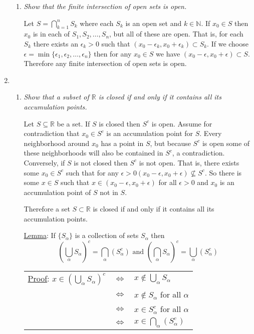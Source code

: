 \documentclass[11pt]{article}
\begin{document}
\begin{enumerate}
\begin{enumerate}
\item \emph{Show that the finite intersection of open sets is open.}

Let $S = \bigcap_{k=1}^nS_k$ where each $S_k$ is an open set and $k \in \mathbb{N}$.  If $x_0 \in S$ then $x_0$ is in each of $S_1,S_2,\ldots,S_n$, but all of these are open.  That is, for each $S_k$ there exists an $\epsilon_k > 0$ such that $(x_0 - \epsilon_k, x_0 + \epsilon_k) \subset S_k$.  If we choose $\epsilon = \min\{\epsilon_1,\epsilon_2,\ldots,\epsilon_n\}$ then for any $x_0 \in S$ we have $(x_0 - \epsilon, x_0 + \epsilon) \subset S$.  Therefore any finite intersection of open sets is open.
\end{enumerate}

\item 
\begin{enumerate}
\item \emph{Show that a subset of $\mathbb{R}$ is closed if and only if it contains all its accumulation points.}

Let $S \subseteq \mathbb{R}$ be a set. If $S$ is closed then $S^c$ is open.  Assume for contradiction that $x_0 \in S^c$ is an accumulation point for $S$.  Every neighborhood around $x_0$ has a point in $S$, but because $S^c$ is open some of these neighborhoods will also be contained in $S^c$, a contradiction.  Conversely, if $S$ is not closed then $S^c$ is not open.  That is, there exists some $x_0 \in S^c$ such that for any $\epsilon > 0(x_0 - \epsilon , x_0 + \epsilon) \nsubseteq S^c$.  So there is some $x \in S$ such that $x \in (x_0 - \epsilon , x_0 + \epsilon)$ for all $\epsilon > 0$ and $x_0$ is an accumulation point of $S$ not in $S$.

Therefore a set $S \subset \mathbb{R}$ is closed if and only if it contains all its accumulation points.

\underline{Lemma}: If $\{S_\alpha\}$ is a collection of sets $S_\alpha$ then
\begin{equation}
\label{OpenClosedUnionIntersect}
\left(\bigcup_\alpha S_\alpha \right)^c = \bigcap_\alpha \left(S_\alpha^c\right) \mbox{ and }
\left(\bigcap_\alpha S_\alpha \right)^c = \bigcup_\alpha \left(S_\alpha^c\right)
\end{equation}

\begin{tabular}{lll}
\underline{Proof}: $x \in \left(\bigcup_\alpha S_\alpha \right)^c$ & $\Leftrightarrow$ & $x \notin \bigcup_\alpha S_\alpha$\\
						& $\Leftrightarrow$ & $x \notin S_\alpha$ for all $\alpha$\\
						& $\Leftrightarrow$ & $x \in S_\alpha^c$ for all $\alpha$\\ 
						& $\Leftrightarrow$ & $x \in \bigcap_\alpha \left(S_\alpha^c\right)$
\end{tabular}


\end{enumerate}
\end{enumerate}
\end{document}

